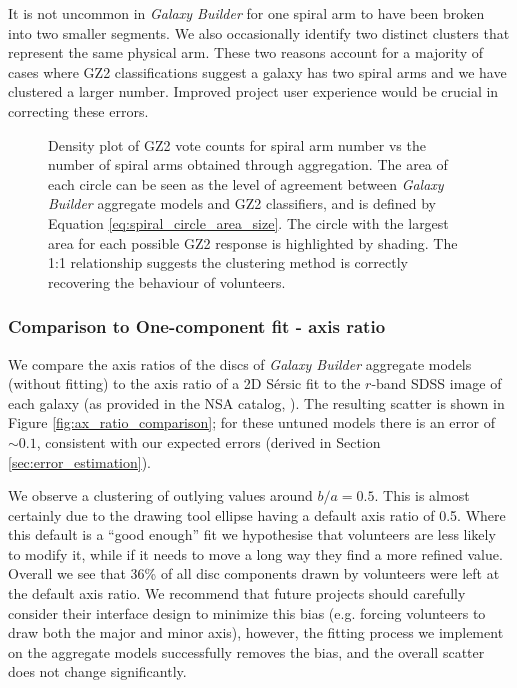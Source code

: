 \documentclass[trackchanges]{aastex63}
\begin{document}
It is not uncommon in \textit{Galaxy Builder} for one spiral arm to have been broken into two smaller segments. We also occasionally identify two distinct clusters that represent the same physical arm. These two reasons account for a majority of cases where GZ2 classifications suggest a galaxy has two spiral arms and we have clustered a larger number. Improved project user experience would be crucial in correcting these errors.

\begin{figure}
  \caption{Density plot of GZ2 vote counts for spiral arm number vs the number of spiral arms obtained through aggregation. The area of each circle can be seen as the level of agreement between \textit{Galaxy Builder} aggregate models and GZ2 classifiers, and is defined by Equation \ref{eq:spiral_circle_area_size}. The circle with the largest area for each possible GZ2 response is highlighted by shading. The 1:1 relationship suggests the clustering method is correctly recovering the behaviour of volunteers.}
  \label{fig:n_spirals_comparison}
\end{figure}


\subsubsection{Comparison to One-component fit - axis ratio}

We compare the axis ratios of the discs of \textit{Galaxy Builder} aggregate models (without fitting) to the axis ratio of a 2D S\'ersic fit to the $r$-band SDSS image of each galaxy (as provided in the NSA catalog, \citealt{2011AJ....142...31B}). The resulting scatter is shown in Figure \ref{fig:ax_ratio_comparison}; for these untuned models there is an error of $\sim0.1$, consistent with our expected errors (derived in Section \ref{sec:error_estimation}).

We observe a clustering of outlying values around $b/a=0.5$. This is almost certainly due to the drawing tool ellipse having a default axis ratio of 0.5. Where this default is a ``good enough'' fit we hypothesise that volunteers are less likely to modify it, while if it needs to move a long way they find a more refined value. Overall we see that 36\% of all disc components drawn by volunteers were left at the default axis ratio. We recommend that future projects should carefully consider their interface design to minimize this bias (e.g. forcing volunteers to draw both the major and minor axis), however, the fitting process we implement on the aggregate models successfully removes the bias, and the overall scatter does not change significantly.
\end{document}
